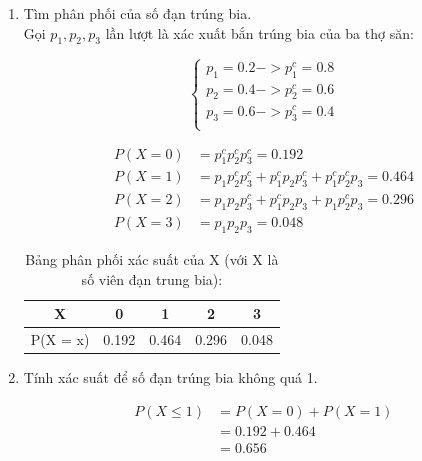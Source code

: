 \documentclass[a4paper,12pt]{article}
\begin{document}
\begin{enumerate}[label = \alph*)]
	\item Tìm phân phối của số đạn trúng bia.\\
		
		Gọi $p_1, p_2, p_3$ lần lượt là xác xuất bắn trúng bia của ba thợ săn:
		
		\begin{equation*}
			\begin{cases}
				p_1 = 0.2 -> p_1^c = 0.8\\
				p_2 = 0.4 -> p_2^c = 0.6\\
				p_3 = 0.6 -> p_3^c = 0.4\\
			\end{cases}
		\end{equation*}
		
		\begin{align*}
			P(X = 0) &= p_1^c p_2^c p_3^c = 0.192\\
			P(X = 1) &= p_1 p_2^c p_3^c + p_1^c p_2 p_3^c + p_1^c p_2^c p_3 = 0.464\\
			P(X = 2) &= p_1 p_2 p_3^c + p_1^c p_2 p_3 + p_1 p_2^c p_3 = 0.296\\
			P(X = 3) &= p_1 p_2 p_3 = 0.048
		\end{align*}
		
		\begin{table}[h!]
			\begin{center}
				\caption{Bảng phân phối xác suất của X (với X là số viên đạn trung bia):}
				\begin{tabular}{|c|c|c|c|c|}
					\hline 
					X & 0 & 1 & 2 & 3 \\ 
					\hline 
					P(X = x) & 0.192 & 0.464 & 0.296 & 0.048 \\ 
					\hline 
				\end{tabular} 
			\end{center}
		\end{table}
	
	\item Tính xác suất để số đạn trúng bia không quá 1.
	
	\begin{align*}
		P(X \leq 1) &= P(X = 0) + P(X = 1) \\
		&= 0.192 + 0.464\\
		&= 0.656
	\end{align*}
	
\end{enumerate}
\end{document}
